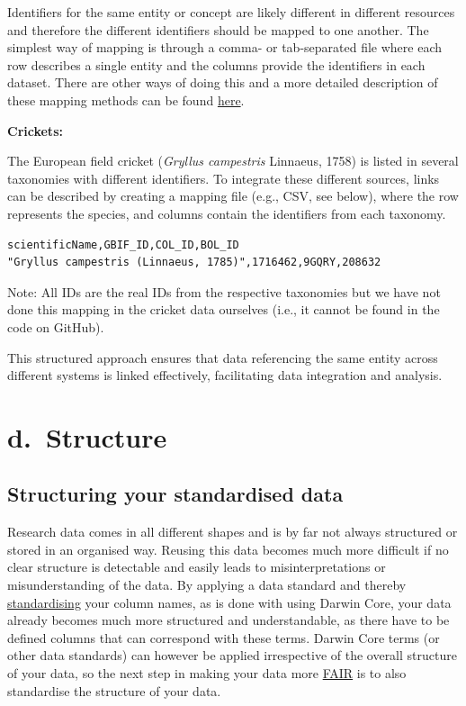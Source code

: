 \documentclass[
  oneside]{book}
\begin{document}
Identifiers for the same entity or concept are likely different in different resources and therefore the different identifiers should be mapped to one another. The simplest way of mapping is through a comma- or tab-separated file where each row describes a single entity and the columns provide the identifiers in each dataset. There are other ways of doing this and a more detailed description of these mapping methods can be found \href{https://faircookbook.elixir-europe.org/content/recipes/interoperability/identifier-mapping.html}{here}.

\begin{examplebox}

\textbf{Crickets:}

The European field cricket (\emph{Gryllus campestris} Linnaeus, 1758) is listed in several taxonomies with different identifiers. To integrate these different sources, links can be described by creating a mapping file (e.g., CSV, see below), where the row represents the species, and columns contain the identifiers from each taxonomy.

\begin{verbatim}
scientificName,GBIF_ID,COL_ID,BOL_ID
"Gryllus campestris (Linnaeus, 1785)",1716462,9GQRY,208632
\end{verbatim}

Note: All IDs are the real IDs from the respective taxonomies but we have not done this mapping in the cricket data ourselves (i.e., it cannot be found in the code on GitHub).

\end{examplebox}

This structured approach ensures that data referencing the same entity across different systems is linked effectively, facilitating data integration and analysis.

\part*{d.~Structure}\label{part-d.-structure}

\chapter{Structuring your standardised data}\label{structuring-your-standardised-data}

Research data comes in all different shapes and is by far not always structured or stored in an organised way. Reusing this data becomes much more difficult if no clear structure is detectable and easily leads to misinterpretations or misunderstanding of the data. By applying a data standard and thereby \hyperref[standardise]{standardising} your column names, as is done with using Darwin Core, your data already becomes much more structured and understandable, as there have to be defined columns that can correspond with these terms. Darwin Core terms (or other data standards) can however be applied irrespective of the overall structure of your data, so the next step in making your data more \hyperref[FAIR]{FAIR} is to also standardise the structure of your data.
\end{document}
